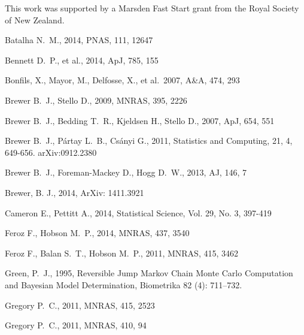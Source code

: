 \documentclass[useAMS,usenatbib]{mn2e}
\begin{document}
This work was supported by a Marsden Fast Start
grant from the Royal Society of
New Zealand.

\begin{thebibliography}{99}
Batalha N.~M., 2014, PNAS, 111, 12647 

 Bennett D.~P., et al., 2014, ApJ, 785, 155 

 Bonfils, X., Mayor, M., Delfosse, X., et al.\ 2007, A\&A, 474, 293 

 Brewer B.~J., Stello D., 2009, MNRAS, 395, 2226 

Brewer B.~J., Bedding T.~R., Kjeldsen H., Stello D., 2007, ApJ, 654, 551 

 Brewer B.~J., P{\'a}rtay L.~B., Cs{\'a}nyi G., 2011,
Statistics and Computing, 21, 4, 649-656. arXiv:0912.2380

 Brewer B.~J., Foreman-Mackey D., Hogg D.~W., 2013, AJ, 146, 7

 Brewer, B. J., 2014,
ArXiv: 1411.3921

 Cameron E., Pettitt A., 2014,
Statistical Science, Vol. 29, No. 3, 397-419

 Feroz F., Hobson M.~P., 2014, MNRAS, 437, 3540 

 Feroz F., Balan S.~T., Hobson M.~P., 2011, MNRAS, 415, 3462

Green, P.~J., 1995, Reversible Jump Markov Chain Monte Carlo Computation and Bayesian Model Determination, Biometrika 82 (4): 711–732.

Gregory P.~C., 2011, MNRAS, 415, 2523 

Gregory P.~C., 2011, MNRAS, 410, 94 


\end{thebibliography}
\end{document}

